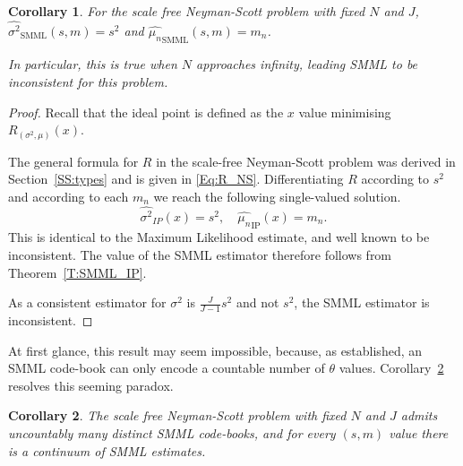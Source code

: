 \documentclass{IEEEtran}
\newtheorem{cor}{Corollary}[thm]
\begin{document}
\begin{cor}\label{C:inconsistent}
For the scale free Neyman-Scott problem with fixed $N$ and $J$,
$\widehat{\sigma^2}_{\text{SMML}}(s,m)=s^2$
and
$\widehat{\mu_n}_{\text{SMML}}(s,m)=m_n$.

In particular, this is true when $N$ approaches infinity, leading SMML to be
inconsistent for this problem.
\end{cor}

\begin{proof}
Recall that the ideal point is defined as the $x$ value
minimising $R_{(\sigma^2, \mu)}(x)$.

The general formula for $R$ in the scale-free Neyman-Scott problem was
derived in Section~\ref{SS:types} and is given in \eqref{Eq:R_NS}.
Differentiating $R$ according to $s^2$
and according to each $m_n$ we reach the following single-valued solution.
\begin{equation}\label{Eq:NSIP}
\widehat{\sigma^2}_{\textit{IP}}(x)=s^2,\quad
\widehat{\mu_n}_{\text{IP}}(x)=m_n.
\end{equation}
This is identical to the Maximum Likelihood estimate, and well known to be
inconsistent. The value
of the SMML estimator therefore follows from Theorem~\ref{T:SMML_IP}.

As a consistent estimator for $\sigma^2$ is $\frac{J}{J-1}s^2$ and not $s^2$,
the SMML estimator is inconsistent.
\end{proof}

At first glance, this result may seem impossible, because, as established,
an SMML code-book can only encode a countable number of $\theta$ values.
Corollary~\ref{C:uncountable} resolves this seeming paradox.

\begin{cor}\label{C:uncountable}
The scale free Neyman-Scott problem with fixed $N$ and $J$ admits
uncountably many distinct SMML code-books, and for every $(s,m)$
value there is a continuum of SMML estimates.
\end{cor}
\end{document}
